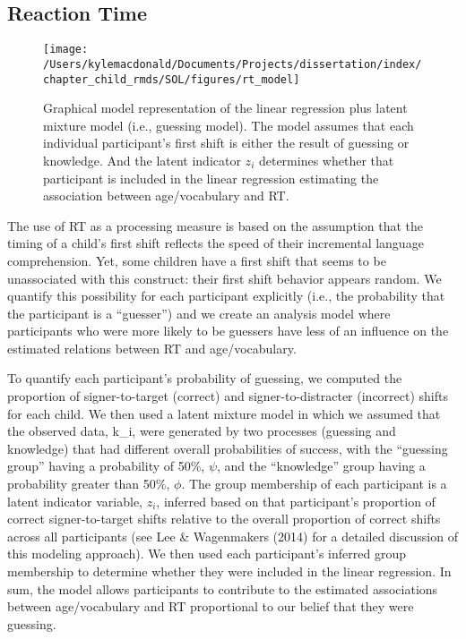 \documentclass[oneside]{report}
\begin{document}
\subsection{Reaction Time}\label{reaction-time}
\begin{figure}[!t]

{\centering \texttt{[image: /Users/kylemacdonald/Documents/Projects/dissertation/index/chapter\_child\_rmds/SOL/figures/rt\_model]} 

}

\caption[Graphical representation of the RT model in Experiment 1.1.]{Graphical model representation of the linear regression plus latent mixture model (i.e., guessing model). The model assumes that each individual participant's first shift is either the result of guessing or knowledge. And the latent indicator $z_i$ determines whether that participant is included in the linear regression estimating the association between age/vocabulary and RT.}\label{fig:unnamed-chunk-9}
\end{figure}
The use of RT as a processing measure is based on the assumption that
the timing of a child's first shift reflects the speed of their
incremental language comprehension. Yet, some children have a first
shift that seems to be unassociated with this construct: their first
shift behavior appears random. We quantify this possibility for each
participant explicitly (i.e., the probability that the participant is a
``guesser'') and we create an analysis model where participants who were
more likely to be guessers have less of an influence on the estimated
relations between RT and age/vocabulary.

To quantify each participant's probability of guessing, we computed the
proportion of signer-to-target (correct) and signer-to-distracter
(incorrect) shifts for each child. We then used a latent mixture model
in which we assumed that the observed data, k\_i, were generated by two
processes (guessing and knowledge) that had different overall
probabilities of success, with the ``guessing group'' having a
probability of 50\%, \(\psi\), and the ``knowledge'' group having a
probability greater than 50\%, \(\phi\). The group membership of each
participant is a latent indicator variable, \(z_i\), inferred based on
that participant's proportion of correct signer-to-target shifts
relative to the overall proportion of correct shifts across all
participants (see Lee \& Wagenmakers (2014) for a detailed discussion of
this modeling approach). We then used each participant's inferred group
membership to determine whether they were included in the linear
regression. In sum, the model allows participants to contribute to the
estimated associations between age/vocabulary and RT proportional to our
belief that they were guessing.
\end{document}
